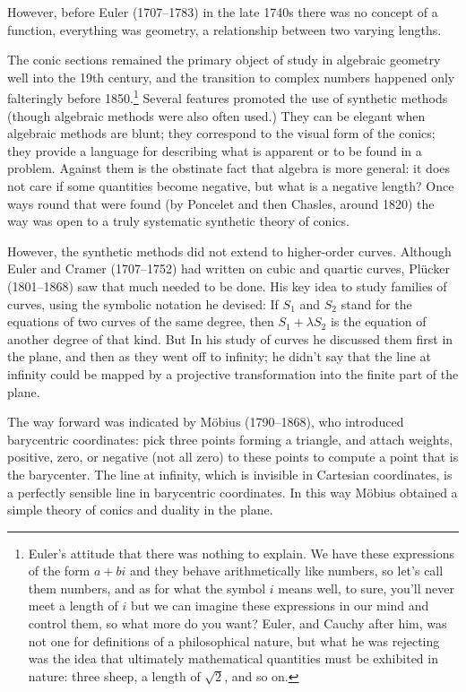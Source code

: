 However, before Euler (1707--1783) in the late 1740s there was no concept of a function, everything was geometry, a relationship between two varying lengths.

The conic sections remained the primary object of study in algebraic geometry well into the 19th century, and
the transition to complex numbers happened only falteringly before 1850.\footnote{Euler's attitude that there was nothing to explain. We have these expressions of the form $a+bi$ and they behave arithmetically like numbers, so let's call them numbers, and as for what the symbol $i$ means well, to sure, you'll never meet a length of $i$ but we can imagine these expressions in our mind and control them, so what more do you want? Euler, and Cauchy after him, was not one for definitions of a philosophical nature, but what he was rejecting was the idea that ultimately mathematical quantities must be exhibited in nature: three sheep, a length of $\sqrt{2}$, and so on.} Several features promoted the use of synthetic methods (though algebraic methods were also often used.)  They can be elegant when algebraic methods are blunt; they correspond to the visual form of the conics; they provide a language for describing what is apparent or to be found in a problem. Against them is the obstinate fact that algebra is more general: it does not care if some quantities become negative, but what is a negative length? Once ways round that were found (by Poncelet and then Chasles, around 1820) the way was open to a truly systematic synthetic theory of conics. 

However, the synthetic methods did not extend to higher-order curves.  Although Euler and Cramer (1707--1752) had written on cubic and quartic curves, Pl\"ucker (1801--1868) saw that much needed to be done. His key idea to study families of curves, using the symbolic notation he devised: If $S_1$ and $S_2$ stand for the equations of two curves of the same degree, then $S_1 + \lambda S_2$ is the equation of another degree of that kind. But In his study of curves he discussed them first in  the plane, and then as they went off to infinity; he didn't say that the line at infinity could be mapped by a projective transformation into the finite part of the plane.

The way forward was indicated by M\"obius (1790--1868), who introduced barycentric coordinates: pick three points forming a triangle, and attach weights, positive, zero, or negative (not all zero) to these points to compute a point that is the barycenter.  The line at infinity, which is invisible in Cartesian coordinates, is a perfectly sensible line in barycentric coordinates. In this way M\"obius obtained a simple theory of conics and duality in the plane.  

